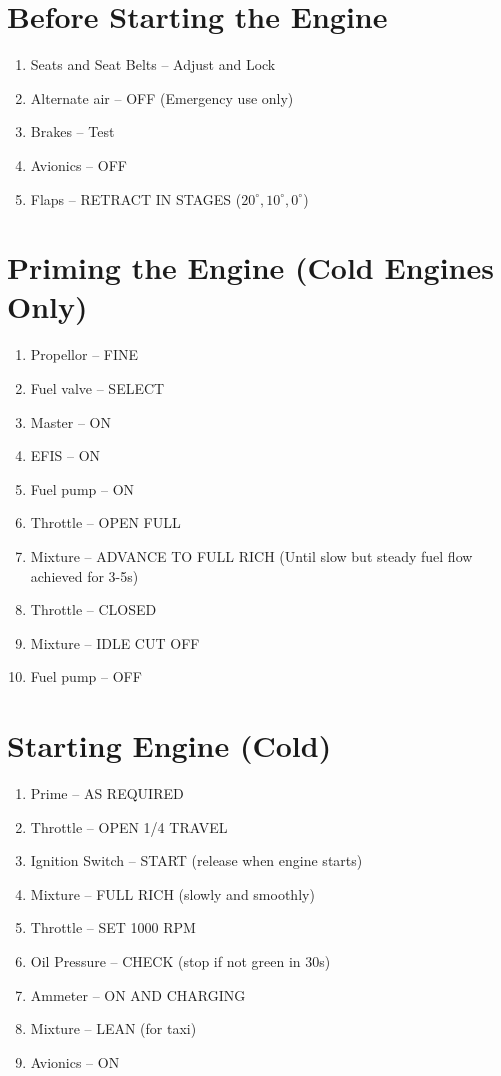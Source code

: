 \section{Before Starting the Engine}
\begin{enumerate}[(1)]
  \item Seats and Seat Belts -- Adjust and Lock
  \item Alternate air -- OFF (Emergency use only)
  \item Brakes -- Test
  \item Avionics -- OFF
  \item Flaps -- RETRACT IN STAGES ($20^\circ, 10^\circ, 0^\circ$)
\end{enumerate}

\section{Priming the Engine (Cold Engines Only)}
\begin{enumerate}[(1)]
  \item Propellor -- FINE
  \item Fuel valve -- SELECT
  \item Master -- ON
  \item EFIS -- ON
  \item Fuel pump -- ON
  \item Throttle -- OPEN FULL
  \item Mixture -- ADVANCE TO FULL RICH (Until slow but steady fuel flow achieved for 3-5s)
  \item Throttle -- CLOSED
  \item Mixture -- IDLE CUT OFF
  \item Fuel pump -- OFF
\end{enumerate}

\section{Starting Engine (Cold)}
\begin{enumerate}[(1)]
  \item Prime -- AS REQUIRED
  \item Throttle -- OPEN 1/4 TRAVEL
  \item Ignition Switch -- START (release when engine starts)
  \item Mixture -- FULL RICH (slowly and smoothly)
  \item Throttle -- SET 1000 RPM
  \item Oil Pressure -- CHECK (stop if not green in 30s)
  \item Ammeter -- ON AND CHARGING
  \item Mixture -- LEAN (for taxi)
  \item Avionics -- ON 
\end{enumerate}

